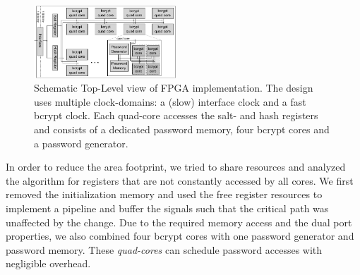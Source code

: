 \begin{figure}[tp] \centering
	\includegraphics[width=0.475\textwidth]{figures/bcrypt_design_overview.pdf}
	\caption{Schematic Top-Level view of FPGA implementation. The design
	uses multiple clock-domains: a (slow) interface clock and a fast bcrypt
	clock. Each quad-core accesses the salt- and hash registers and consists of 
	a dedicated password memory, four bcrypt cores and a password generator.}
	\label{fig:bcrypt_design_overview}
\end{figure}

In order to reduce the area footprint, we tried to share resources and
analyzed the algorithm for registers that are not constantly accessed by all
cores. We first removed the initialization memory and used the free register
resources to implement a pipeline and buffer the signals such that the critical
path was unaffected by the change. Due to the required memory access and the
dual port properties, we also combined four bcrypt cores with one password
generator and password memory. These \emph{quad-cores} can schedule password
accesses with negligible overhead.


